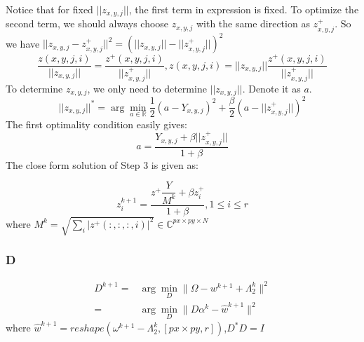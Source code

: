 \documentclass{article}
\numberwithin{equation}{section}
\begin{document}
 Notice that for fixed $||z_{x,y,j}||$, the first term in expression is fixed. To optimize the second term, we should always choose $z_{x,y,j}$ with the same direction as $z_{x,y,j}^+$. So we have  $||z_{x,y,j} - z_{x,y,j}^+||^2 = (||z_{x,y,j}|| - ||z_{x,y,j}^+||)^2$
 $$
  \dfrac{z(x,y,j,i)}{||z_{x,y,j}||} = \dfrac{z^+(x,y,j,i)}{||z_{x,y,j}^+||}, z(x,y,j,i) = ||z_{x,y,j}||\dfrac{z^+(x,y,j,i)}{||z_{x,y,j}^+||}
 $$
 To determine $z_{x,y,j}$, we only need to determine $||z_{x,y,j}||$. Denote it as $a$.
 $$
 ||z_{x,y,j}||^* = \arg \min_{a \in \mathbb{R}} \frac{1}{2}(a - Y_{x,y,j})^2 + \dfrac{\beta}{2}
 (a - ||z_{x,y,j}^+||)^2
 $$
 The first optimality condition easily gives:
 $$
 a = \dfrac{Y_{x,y,j} + \beta ||z_{x,y,j}^+||}{1 + \beta}
 $$
 The  close form solution of Step 3 is given as:
 
 \begin{equation}
 z_i^{k+1} = \dfrac{z^+ \dfrac{Y}{ M^k} + \beta z_i^+}{1+\beta}, 1 \leq i \leq r
 \label{zup}
 \end{equation}
 where $M^k =\sqrt{\sum_i |z^+(:,:,:,i)|^2} \in \mathbb{C}^{px \times py \times N}$
 
\subsubsection{D}

$$
\begin{aligned}
D^{k+1} =& \arg \min_{D} \| \Omega -  w^{k+1} + \Lambda_2^{k}\|^{2} \\
=& \arg \min_{D} \| D\alpha^k - \hat {w}^{k+1}\|^{2} 
\end{aligned}
$$
where $\hat {w}^{k+1} = reshape( \omega^{k+1} - \Lambda_2^{k},[px\times py,r])$,$D^*D=I$
\end{document}
